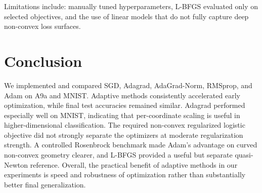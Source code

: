 \documentclass{article}
\begin{document}
Limitations include: manually tuned hyperparameters, L-BFGS evaluated only on selected objectives, and the use of linear models that do not fully capture deep non-convex loss surfaces.

\section{Conclusion}
We implemented and compared SGD, Adagrad, AdaGrad-Norm, RMSprop, and Adam on A9a and MNIST. Adaptive methods consistently accelerated early optimization, while final test accuracies remained similar. Adagrad performed especially well on MNIST, indicating that per-coordinate scaling is useful in higher-dimensional classification. The required non-convex regularized logistic objective did not strongly separate the optimizers at moderate regularization strength. A controlled Rosenbrock benchmark made Adam's advantage on curved non-convex geometry clearer, and L-BFGS provided a useful but separate quasi-Newton reference. Overall, the practical benefit of adaptive methods in our experiments is speed and robustness of optimization rather than substantially better final generalization.



\end{document}
